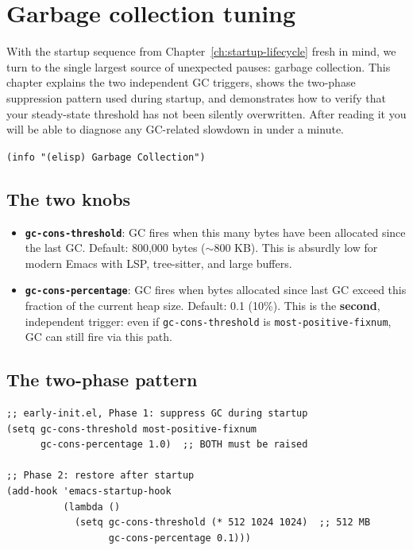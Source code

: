 \chapter{Garbage collection tuning}
\label{ch:gc-tuning}
\minitoc\label{garbage-collection-tuning}

With the startup sequence from Chapter~\ref{ch:startup-lifecycle}
fresh in mind, we turn to the single largest source of unexpected
pauses: garbage collection.  This chapter explains the two
independent GC triggers, shows the two-phase suppression pattern
used during startup, and demonstrates how to verify that your
steady-state threshold has not been silently overwritten.  After
reading it you will be able to diagnose any GC-related slowdown in
under a minute.

\texttt{(info "(elisp) Garbage Collection")}

\section{The two knobs}\label{the-two-knobs}

\begin{itemize}
\item \textbf{\texttt{gc-cons-threshold}}: GC fires when this many bytes have been allocated since the last GC. Default: 800,000 bytes (\(\sim\)800 KB). This is absurdly low for modern Emacs with LSP, tree-sitter, and large buffers.
\item \textbf{\texttt{gc-cons-percentage}}: GC fires when bytes allocated since last GC exceed this fraction of the current heap size. Default: 0.1 (10\%). This is the \textbf{second}, independent trigger: even if \texttt{gc-cons-threshold} is \texttt{most-positive-fixnum}, GC can still fire via this path.
\end{itemize}

\section{The two-phase pattern}\label{the-two-phase-pattern}

\begin{verbatim}
;; early-init.el, Phase 1: suppress GC during startup
(setq gc-cons-threshold most-positive-fixnum
      gc-cons-percentage 1.0)  ;; BOTH must be raised

;; Phase 2: restore after startup
(add-hook 'emacs-startup-hook
          (lambda ()
            (setq gc-cons-threshold (* 512 1024 1024)  ;; 512 MB
                  gc-cons-percentage 0.1)))
\end{verbatim}

